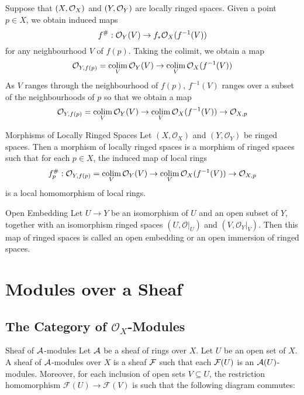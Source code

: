 \documentclass[a4paper]{article}
\begin{document}
Suppose that $(X,\mathcal{O}_X)$ and $(Y,\mathcal{O}_Y)$ are locally ringed spaces. Given a point $p\in X$, we obtain induced maps $$f^\#:\mathcal{O}_Y(V)\to f_\ast\mathcal{O}_X(f^{-1}(V))$$ for any neighbourhood $V$ of $f(p)$. Taking the colimit, we obtain a map $$\mathcal{O}_{Y,f(p)}=\operatorname*{colim}_V\mathcal{O}_Y(V)\to\operatorname*{colim}_V\mathcal{O}_X(f^{-1}(V))$$ As $V$ ranges through the neighbourhood of $f(p)$, $f^{-1}(V)$ ranges over a subset of the neighbourhoods of $p$ so that we obtain a map $$\mathcal{O}_{Y,f(p)}=\operatorname*{colim}_V\mathcal{O}_Y(V)\to\operatorname*{colim}_V\mathcal{O}_X(f^{-1}(V))\to\mathcal{O}_{X,p}$$

\begin{defn}{Morphisms of Locally Ringed Spaces}{} Let $(X,\mathcal{O}_X)$ and $(Y,\mathcal{O}_Y)$ be ringed spaces. Then a morphism of locally ringed spaces is a morphism of ringed spaces such that for each $p\in X$, the induced map of local rings $$f_p^\#:\mathcal{O}_{Y,f(p)}=\operatorname*{colim}_V\mathcal{O}_Y(V)\to\operatorname*{colim}_V\mathcal{O}_X(f^{-1}(V))\to\mathcal{O}_{X,p}$$ is a local homomorphism of local rings. 
\end{defn}

\begin{defn}{Open Embedding}{} Let $U\to Y$ be an isomorphism of $U$ and an open subset of $Y$, together with an isomorphism ringed spaces $(U,\mathcal{O}|_U)$ and $(V,\mathcal{O}_Y|_V)$. Then this map of ringed spaces is called an open embedding or an open immersion of ringed spaces. 
\end{defn}

\pagebreak
\section{Modules over a Sheaf}
\subsection{The Category of $\mathcal{O}_X$-Modules}
\begin{defn}{Sheaf of $\mathcal{A}$-modules}{} Let $\mathcal{A}$ be a sheaf of rings over $X$. Let $U$ be an open set of $X$. A sheaf of $\mathcal{A}$-modules over $X$ is a sheaf $\mathcal{F}$ such that each $\mathcal{F}(U)$ is an $\mathcal{A}(U)$-modules. Moreover, for each inclusion of open sets $V\subseteq U$, the restriction homomorphism $\mathcal{F}(U)\to\mathcal{F}(V)$ is such that the following diagram commutes: \\~\\
\end{defn}
\end{document}
